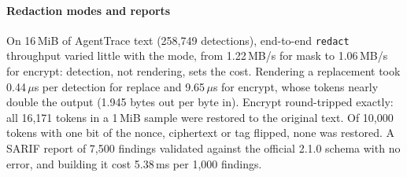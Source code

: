 \paragraph{Redaction modes and reports} On 16\,MiB of AgentTrace text (258,749 detections), end-to-end \texttt{redact} throughput varied little with the mode, from 1.22\,MB/s for mask to 1.06\,MB/s for encrypt: detection, not rendering, sets the cost. Rendering a replacement took 0.44\,$\mu$s per detection for replace and 9.65\,$\mu$s for encrypt, whose tokens nearly double the output (1.945 bytes out per byte in). Encrypt round-tripped exactly: all 16,171 tokens in a 1\,MiB sample were restored to the original text. Of 10,000 tokens with one bit of the nonce, ciphertext or tag flipped, none was restored. A SARIF report of 7,500 findings validated against the official 2.1.0 schema with no error, and building it cost 5.38\,ms per 1,000 findings.
